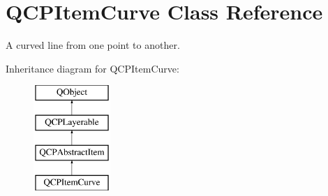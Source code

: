 \hypertarget{classQCPItemCurve}{\section{Q\-C\-P\-Item\-Curve Class Reference}
\label{classQCPItemCurve}
}


A curved line from one point to another.  


Inheritance diagram for Q\-C\-P\-Item\-Curve\-:\begin{figure}[H]
\begin{center}
\leavevmode
\includegraphics[height=4.000000cm]{classQCPItemCurve}
\end{center}
\end{figure}
